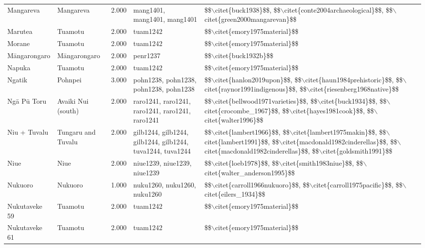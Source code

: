 \begin{longtable}{p{1.8cm}p{1.8cm}p{1.8cm}p{2cm}p{7cm}}
  Mangareva & Mangareva & 2.000 & mang1401, mang1401, mang1401 & \$\$$\backslash$citet\{buck1938\}\$\$, \$\$$\backslash$citet\{conte2004archaeological\}\$\$, \$\$$\backslash$citet\{green2000mangarevan\}\$\$ \\ 
  Marutea & Tuamotu & 2.000 & tuam1242 & \$\$$\backslash$citet\{emory1975material\}\$\$ \\ 
  Morane & Tuamotu & 2.000 & tuam1242 & \$\$$\backslash$citet\{emory1975material\}\$\$ \\ 
  Māngarongaro & Māngarongaro & 2.000 & penr1237 & \$\$$\backslash$citet\{buck1932b\}\$\$ \\ 
  Napuka & Tuamotu & 2.000 & tuam1242 & \$\$$\backslash$citet\{emory1975material\}\$\$ \\ 
  Ngatik & Pohnpei & 3.000 & pohn1238, pohn1238, pohn1238, pohn1238 & \$\$$\backslash$citet\{hanlon2019upon\}\$\$, \$\$$\backslash$citet\{haun1984prehistoric\}\$\$, \$\$$\backslash$citet\{raynor1991indigenous\}\$\$, \$\$$\backslash$citet\{riesenberg1968native\}\$\$ \\ 
  Ngā Pū Toru & Avaiki Nui (south) & 2.000 & raro1241, raro1241, raro1241, raro1241, raro1241 & \$\$$\backslash$citet\{bellwood1971varieties\}\$\$, \$\$$\backslash$citet\{buck1934\}\$\$, \$\$$\backslash$citet\{crocombe\_1967\}\$\$, \$\$$\backslash$citet\{hayes1981cook\}\$\$, \$\$$\backslash$citet\{walter1996\}\$\$ \\ 
  Niu + Tuvalu & Tungaru and Tuvalu & 2.000 & gilb1244, gilb1244, gilb1244, gilb1244, tuva1244, tuva1244 & \$\$$\backslash$citet\{lambert1966\}\$\$, \$\$$\backslash$citet\{lambert1975makin\}\$\$, \$\$$\backslash$citet\{lambert1991\}\$\$, \$\$$\backslash$citet\{macdonald1982cinderellas\}\$\$, \$\$$\backslash$citet\{macdonald1982cinderellas\}\$\$, \$\$$\backslash$citet\{goldsmith1991\}\$\$ \\ 
  Niue & Niue & 2.000 & niue1239, niue1239, niue1239 & \$\$$\backslash$citet\{loeb1978\}\$\$, \$\$$\backslash$citet\{smith1983niue\}\$\$, \$\$$\backslash$citet\{walter\_anderson1995\}\$\$ \\ 
  Nukuoro & Nukuoro & 1.000 & nuku1260, nuku1260, nuku1260 & \$\$$\backslash$citet\{carroll1966nukuoro\}\$\$, \$\$$\backslash$citet\{carroll1975pacific\}\$\$, \$\$$\backslash$citet\{eilers\_1934\}\$\$ \\ 
  Nukutaveke 59 & Tuamotu & 2.000 & tuam1242 & \$\$$\backslash$citet\{emory1975material\}\$\$ \\ 
  Nukutaveke 61 & Tuamotu & 2.000 & tuam1242 & \$\$$\backslash$citet\{emory1975material\}\$\$ \\ 

\end{longtable}
